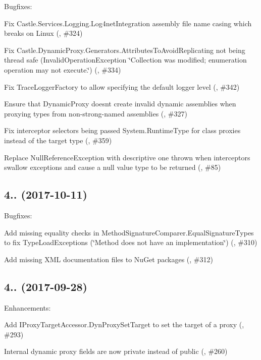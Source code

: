 Bugfixes\+:
\begin{DoxyItemize}
\item Fix Castle.\+Services.\+Logging.\+Log4net\+Integration assembly file name casing which breaks on Linux (, \#324)
\item Fix Castle.\+Dynamic\+Proxy.\+Generators.\+Attributes\+To\+Avoid\+Replicating not being thread safe (Invalid\+Operation\+Exception \char`\"{}\+Collection was modified; enumeration operation may not execute.\char`\"{}) (, \#334)
\item Fix Trace\+Logger\+Factory to allow specifying the default logger level (, \#342)
\item Ensure that Dynamic\+Proxy doesn\textquotesingle{}t create invalid dynamic assemblies when proxying types from non-\/strong-\/named assemblies (, \#327)
\item Fix interceptor selectors being passed {\ttfamily System.\+Runtime\+Type} for class proxies instead of the target type (, \#359)
\item Replace Null\+Reference\+Exception with descriptive one thrown when interceptors swallow exceptions and cause a null value type to be returned (, \#85)
\end{DoxyItemize}

\subsection*{4.. (2017-\/10-\/11)}

Bugfixes\+:
\begin{DoxyItemize}
\item Add missing equality checks in {\ttfamily Method\+Signature\+Comparer.\+Equal\+Signature\+Types} to fix {\ttfamily Type\+Load\+Exception}s (\char`\"{}\+Method does not have an implementation\char`\"{}) (, \#310)
\item Add missing X\+ML documentation files to Nu\+Get packages (, \#312)
\end{DoxyItemize}

\subsection*{4.. (2017-\/09-\/28)}

Enhancements\+:
\begin{DoxyItemize}
\item Add I\+Proxy\+Target\+Accessor.\+Dyn\+Proxy\+Set\+Target to set the target of a proxy (, \#293)
\item Internal dynamic proxy fields are now private instead of public (, \#260)
\end{DoxyItemize}

